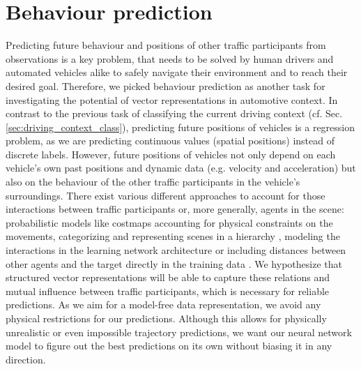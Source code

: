 \section{Behaviour prediction}
Predicting future behaviour and positions of other traffic participants from observations is a key problem, that needs to be solved by human drivers and automated vehicles alike to safely navigate their environment and to reach their desired goal.
Therefore, we picked behaviour prediction as another task for investigating the potential of vector representations in automotive context.
In contrast to the previous task of classifying the current driving context (cf. Sec. \ref{sec:driving_context_class}), predicting future positions of vehicles is a regression problem, as we are predicting continuous values (spatial positions) instead of discrete labels.
However, future positions of vehicles not only depend on each vehicle's own past positions and dynamic data (e.g. velocity and acceleration) but also on the behaviour of the other traffic participants in the vehicle's surroundings.
There exist various different approaches to account for those interactions between traffic participants or, more generally, agents in the scene: probabilistic models like costmaps \cite{Bahram2016} accounting for physical constraints on the movements, categorizing and representing scenes in a hierarchy \cite{Bonnin2012}, modeling the interactions in the learning network architecture \cite{Alahi2016} or including distances between other agents and the target directly in the training data \cite{Altche2018}.
We hypothesize that structured vector representations will be able to capture these relations and mutual influence between traffic participants, which is necessary for reliable predictions.
As we aim for a model-free data representation, we avoid any physical restrictions for our predictions.
Although this allows for physically unrealistic or even impossible trajectory predictions, we want our neural network model to figure out the best predictions on its own without biasing it in any direction.

